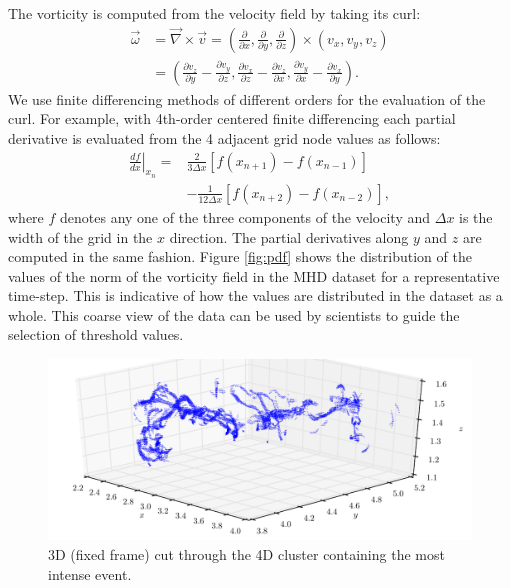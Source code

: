 \documentclass{sig-alternate}
\begin{document}
The vorticity is computed from the velocity field by taking its curl:
\begin{align}
\vec{\omega} &= \vec{\nabla} \times \vec{v} = \left( \frac{\partial}{\partial x}, \frac{\partial}{\partial y}, \frac{\partial}{\partial z} \right) 
\times \nonumber \left( v_x, v_y, v_z \right)\\
&= \left( \frac{\partial v_z}{\partial y} - \frac{\partial v_y}{\partial z}, \frac{\partial v_x}{\partial z} - \frac{\partial v_z}{\partial x}, 
\frac{\partial v_y}{\partial x} - \frac{\partial v_x}{\partial y} \right).
\label{eq:curl}
\end{align}
We use finite differencing methods of
different orders for the evaluation of the curl. For example, with 4th-order centered finite differencing each partial derivative is evaluated from the 4
adjacent grid node values as follows:  
\begin{align} 
\left.\frac{df}{dx}\right|_{x_n} = &\frac{2}{3\Delta x}[f(x_{n+1})-f(x_{n-1})]\nonumber\\ 
&-\frac{1}{12\Delta x}[f(x_{n+2})-f(x_{n-2})],
\end{align}
where $f$ denotes any one of the three components of the velocity and $\Delta x$ is the width of the grid in the $x$ direction. The partial derivatives
along $y$ and $z$ are computed in the same fashion. 
Figure \ref{fig:pdf} shows the distribution of the values of the norm of the vorticity field in the MHD dataset for a representative time-step. This is indicative 
of how the values are distributed in the dataset as a whole.
This coarse view of the data can be used by scientists to guide the selection of threshold values.

\begin{figure}[t]
\centering
\includegraphics[width=7in]{Figures/most_intense_cluster_alt.pdf}
\caption{3D (fixed frame) cut through the 4D cluster containing the most intense event.}
\label{fig:max_vort_cluster}
\end{figure}
\end{document}
